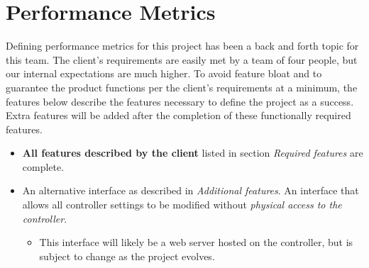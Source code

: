 \documentclass[onecolumn, draftclsnofoot,10pt, compsoc]{IEEEtran}
\begin{document}
	\section*{Performance Metrics}
	Defining performance metrics for this project has been a back and forth topic for this team. The client's requirements are easily met by a team of four people, but our internal expectations are much higher. To avoid feature bloat and to guarantee the product functions per the client's requirements at a minimum, the features below describe the features necessary to define the project as a success. Extra features will be added after the completion of these functionally required features.
	\begin{itemize}
		\item \textbf{All features described by the client} listed in section \textit{Required features} are complete.
		\item An alternative interface as described in \textit{Additional features}. An interface that allows all controller settings to be modified without \textit{physical access to the controller}.
		\begin{itemize}
			\item This interface will likely be a web server hosted on the controller, but is subject to change as the project evolves.
		\end{itemize}
	\end{itemize}
\end{document}
